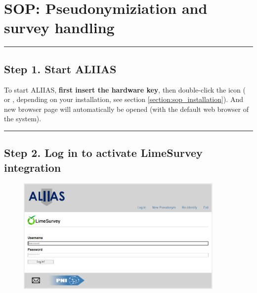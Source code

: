 \pagebreak
\section{SOP: Pseudonymiziation and survey handling}
\label{section:sop_aliias}

\par\noindent\rule{\textwidth\color{pniblue}}{0.4pt}
\subsection*{Step 1. Start ALIIAS}

To start ALIIAS, \textbf{first insert the hardware key}, then double-click the  icon ( or , depending on your installation, see section \ref{section:sop_installation}). And new browser page will automatically be opened (with the default web browser of the system).

\small\setlength\fboxsep{5pt}\setlength\fboxrule{1pt}

\large

\par\noindent\rule{\textwidth\color{pniblue}}{0.4pt}
\subsection*{Step 2. Log in to activate LimeSurvey integration}

\begin{figure}[H]
\includegraphics[width=0.9\textwidth]{docs/fig/01_login.PNG}
\end{figure}


